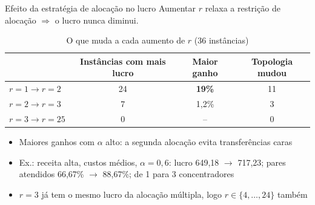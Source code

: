 \documentclass[aspectratio=169, 10pt]{beamer}
\begin{document}
\begin{frame}{Efeito da estratégia de alocação no lucro}
  \small
  Aumentar $r$ relaxa a restrição de alocação $\Rightarrow$ \alert{o lucro nunca diminui}.

  \begin{table}
    \centering
    \footnotesize
    \caption{O que muda a cada aumento de $r$ (36 instâncias)}
    \begin{tabular}{lccc}
      \toprule
       & Instâncias com mais lucro & Maior ganho & Topologia mudou\\
      \midrule
      $r=1 \to r=2$ & 24 & \textbf{19\%} & 11 \\
      $r=2 \to r=3$ & 7 & 1,2\% & 3 \\
      $r=3 \to r=25$ & 0 & -- & 0 \\
      \bottomrule
    \end{tabular}
  \end{table}

  \begin{itemize}
    \item Maiores ganhos com \alert{$\alpha$ alto}: a segunda alocação evita transferências caras
    \item Ex.: receita alta, custos médios, $\alpha=0{,}6$: lucro 649,18 $\to$ 717,23; pares atendidos 66,67\% $\to$ 88,67\%; de 1 para 3 concentradores
    \item $r=3$ já tem o mesmo lucro da alocação múltipla, logo $r\in\{4,\dots,24\}$ também
  \end{itemize}
\end{frame}
\end{document}
